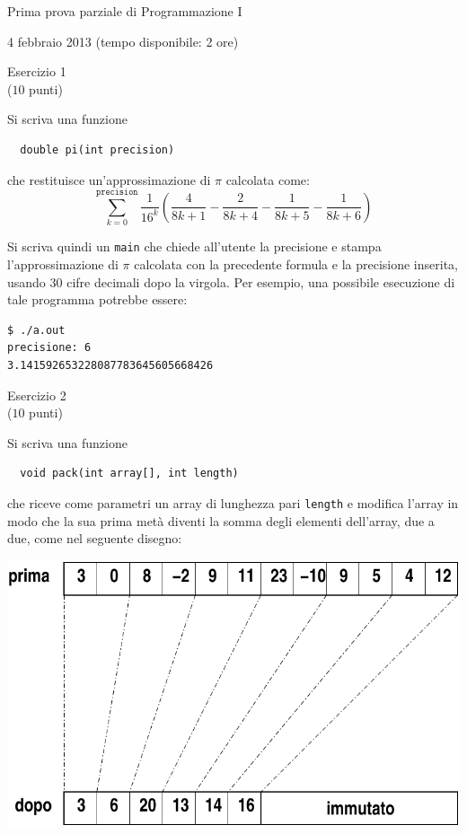 \documentclass[italian,12pt]{article}
\begin{document}
\begin{center}{\LARGE Prima prova parziale di Programmazione I}\\
\begin{center}
  \Large 4 febbraio 2013 (tempo disponibile: 2 ore)
\end{center}
\end{center}
\begin{center}{\Large Esercizio 1}\\
($10$ punti)
\end{center}
Si scriva una funzione
\begin{verbatim}
  double pi(int precision)
\end{verbatim}
che restituisce un'approssimazione di $\pi$ calcolata come:
\[
  \sum\limits_{k=0}^{\mathtt{precision}}\frac{1}{16^k}\left(
    \frac{4}{8k+1}
    -\frac{2}{8k+4}
    -\frac{1}{8k+5}
    -\frac{1}{8k+6}
  \right)
\]

\noindent
Si scriva quindi un \texttt{main} che chiede all'utente la precisione e stampa l'approssimazione
di $\pi$ calcolata con la precedente formula e la precisione inserita, usando 30 cifre
decimali dopo la virgola. Per esempio, una possibile
esecuzione di tale programma potrebbe essere:
%
{\small
\begin{verbatim}
$ ./a.out
precisione: 6
3.141592653228087783645605668426
\end{verbatim}
}
%
\begin{center}{\Large Esercizio 2}\\
($10$ punti)
\end{center}
%
Si scriva una funzione
%
\begin{verbatim}
  void pack(int array[], int length)
\end{verbatim}
%
che riceve come parametri un array di lunghezza pari
\texttt{length} e modifica
l'array in modo che la sua prima met\`a diventi la
somma degli elementi dell'array, due a due, come nel seguente
disegno:

\begin{center}
\includegraphics[scale=0.8]{array.pdf}
\end{center}
\end{document}
